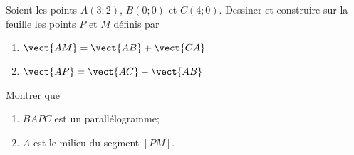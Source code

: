 
\begin{exercice}\label{exosmath-0588}

    Soient les points \( A(3;2)\), \( B(0;0)\) et \( C(4;0)\). Dessiner et construire sur la feuille les points \( P\) et \( M\) définis par
    \begin{enumerate}
        \item
            $\vect{ AM }=\vect{ AB }+\vect{ CA }$
        \item
            $\vect{ AP }=\vect{ AC }-\vect{ AB }$
    \end{enumerate}
    Montrer que
    \begin{enumerate}
        \item
            \( BAPC\) est un parallélogramme;
        \item
            \( A\) est le milieu du segment \( [PM]\).
    \end{enumerate}

\end{exercice}
